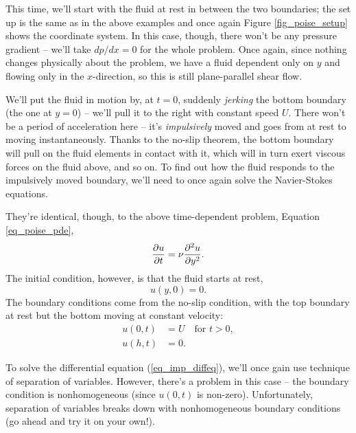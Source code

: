 This time, we'll start with the fluid at rest in between the two boundaries; the set up is the same as in the above examples and  once again Figure \ref{fig_poise_setup} shows the coordinate system.  In this case, though, there won't be any pressure gradient -- we'll take $dp/dx = 0$ for the whole problem.  Once again, since nothing changes physically about the problem, we have a fluid dependent only on $y$ and flowing only in the $x$-direction, so this is still plane-parallel shear flow.  

We'll put the fluid in motion by, at $t = 0$,  suddenly \emph{jerking} the bottom boundary (the one at $y=0$)  -- we'll pull it to the right with constant speed $U$.  There won't be a period of acceleration here -- it's \emph{impulsively} moved and goes from at rest to moving instantaneously.  Thanks to the no-slip theorem, the bottom boundary will pull on the fluid elements in contact with it, which will in turn exert viscous forces on the fluid above, and so on.  To find out how the fluid responds to the impulsively moved boundary, we'll need to once again solve the Navier-Stokes equations.

They're identical, though, to the above time-dependent problem, Equation \ref{eq_poise_pde},
\begin{equation}
\label{eq_imp_diffeq}
\frac{\partial {u}}{\partial {t}} = \nu \frac{\partial^2 {u}}{\partial {y}^2}.
\end{equation}
The initial condition, however, is that the fluid starts at rest,
\begin{equation}
u(y, 0) = 0.
\end{equation}
The boundary conditions come from the no-slip condition, with the top boundary at rest but the bottom moving at constant velocity:
\begin{align}
u(0, t) & = U \quad \text{for } t>0, \\
u(h, t) & = 0.
\end{align}

To solve the differential equation (\ref{eq_imp_diffeq}), we'll once gain use technique of separation of variables.  However, there's a problem in this case -- the boundary condition is nonhomogeneous (since $u(0,t)$ is non-zero).  Unfortunately, separation of variables breaks down with nonhomogeneous boundary conditions (go ahead and try it on your own!).  

